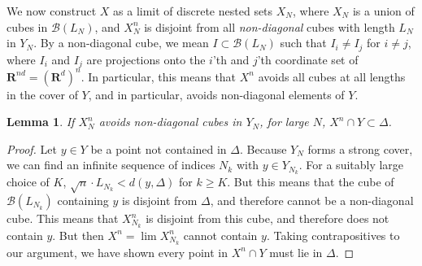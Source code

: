 \documentclass{article}
\theoremstyle{plain}
\newtheorem{lemma}{Lemma}
\theoremstyle{plain}
\begin{document}

We now construct $X$ as a limit of discrete nested sets $X_N$, where $X_N$ is a union of cubes in $\mathcal{B}(L_N)$, and $X_N^n$ is disjoint from all {\it non-diagonal} cubes with length $L_N$ in $Y_N$. By a non-diagonal cube, we mean $I \subset \mathcal{B}(L_N)$ such that $I_i \neq I_j$ for $i \neq j$, where $I_i$ and $I_j$ are projections onto the $i$'th and $j$'th coordinate set of $\mathbf{R}^{nd} = (\mathbf{R}^d)^n$. In particular, this means that $X^n$ avoids all cubes at all lengths in the cover of $Y$, and in particular, avoids non-diagonal elements of $Y$.

\begin{lemma}
	If $X_N^n$ avoids non-diagonal cubes in $Y_N$, for large $N$, $X^n \cap Y \subset \Delta$.
\end{lemma}
\begin{proof}
	Let $y \in Y$ be a point not contained in $\Delta$. Because $Y_N$ forms a strong cover, we can find an infinite sequence of indices $N_k$ with $y \in Y_{N_k}$. For a suitably large choice of $K$, $\sqrt{n} \cdot L_{N_k} < d(y,\Delta)$ for $k \geq K$. But this means that the cube of $\mathcal{B}(L_{N_k})$ containing $y$ is disjoint from $\Delta$, and therefore cannot be a non-diagonal cube. This means that $X_{N_k}^n$ is disjoint from this cube, and therefore does not contain $y$. But then $X^n = \lim X_{N_k}^n$ cannot contain $y$. Taking contrapositives to our argument, we have shown every point in $X^n \cap Y$ must lie in $\Delta$.
\end{proof}

%
%
\end{document}
